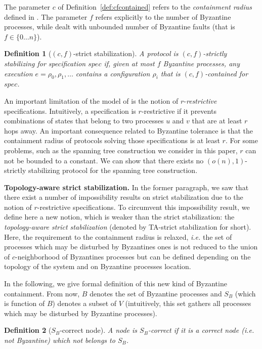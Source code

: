 \documentclass[11pt]{article}
\newtheorem{defi}{Definition}
\newenvironment{definition}[1]{\vspace{-0.25cm}\begin{defi}#1}{\end{defi}\vspace{-0.3cm}}
\begin{document}
The parameter $c$ of Definition~\ref{def:cfcontained} refers to 
the \emph{containment radius} defined in \cite{NA02c}. 
The parameter $f$ refers explicitly to the number of Byzantine processes, 
while \cite{NA02c} dealt with unbounded number of Byzantine faults 
(that is $f\in\{0\ldots n\}$).

\begin{definition}[$(c,f)$-strict stabilization]
\label{def:cfstabilizing}
A protocol is \emph{$(c,f)$-strictly stabilizing} for specification
$spec$ if, given at most $f$ Byzantine processes, any execution
$e=\rho_0,\rho_1,\ldots$ contains a configuration $\rho_i$ that
is $(c,f)$-contained for $spec$.
\end{definition}

An important limitation of the model of \cite{NA02c}
is the notion of $r$-\emph{restrictive} specifications. 
Intuitively, a specification is $r$-restrictive if it prevents 
combinations of states that belong to two processes $u$ and $v$ 
that are at least $r$ hops away. 
An important consequence related to Byzantine tolerance is that 
the containment radius of protocols solving those specifications is 
at least $r$. 
For some problems, such as the spanning tree construction we consider
in this paper, $r$ can not be bounded to a constant.
We can show that there exists no $(o(n),1)$-strictly stabilizing
protocol for the spanning tree construction.

\noindent\textbf{Topology-aware strict stabilization.} In the former paragraph, we saw that there exist a number of impossibility results on strict stabilization due to the notion of $r$-restrictive specifications. To circumvent this impossibility result, we define here a new notion, which is weaker than the strict stabilization: the \emph{topology-aware strict stabilization} (denoted by TA-strict stabilization for short). Here, the requirement to the containment radius is relaxed, \emph{i.e.} the set of processes which may be disturbed by Byzantines ones is not reduced to the union of $c$-neighborhood of Byzantines processes but can be defined depending on the topology of the system and on Byzantine processes location.

In the following, we give formal definition of this new kind of Byzantine containment. From now, $B$ denotes the set of Byzantine processes and $S_B$ (which is function of $B$) denotes a subset of $V$ (intuitively, this set gathers all processes which may be disturbed by Byzantine processes).

\begin{definition}[$S_{B}$-correct node]
A node is \emph{$S_{B}$-correct} if it is a correct node (\emph{i.e.} not Byzantine) which not belongs to $S_{B}$.
\end{definition}
\end{document}

